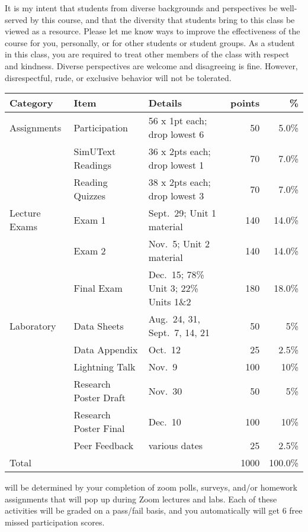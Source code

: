 \documentclass{tufte-handout}
\begin{document}
\begin{fullwidth}
 It is my intent that students from diverse backgrounds and perspectives be well-served by this course, and that the diversity that students bring to this class be viewed as a resource. Please let me know ways to improve the effectiveness of the course for you, personally, or for other students or student groups. As a student in this class, you are required to treat other members of the class with respect and kindness. Diverse perspectives are welcome and disagreeing is fine. However, disrespectful, rude, or exclusive behavior will not be tolerated.


\end{fullwidth}


\begin{fullwidth}



\begin{table}
\begin{tabular}{l l l r r}
Category & Item & Details & points & \% \\
\hline
Assignments & Participation & 56 x 1pt each; drop lowest 6 & 50 & 5.0\% \\
& SimUText Readings   & 36 x 2pts each; drop lowest 1 & 70 & 7.0\% \\
& Reading Quizzes  & 38 x 2pts each; drop lowest 3 & 70 & 7.0\% \\
\hline
Lecture Exams & Exam 1 & Sept.~29; Unit 1 material & 140 & 14.0\% \\
& Exam 2 & Nov.~5; Unit 2 material & 140 & 14.0\% \\
& Final Exam & Dec.~15; 78\% Unit 3; 22\% Units 1\&2 & 180 & 18.0\% \\ 		
\hline
Laboratory & Data Sheets & Aug.~24, 31, Sept.~7, 14, 21 & 50 & 5\% \\
& Data Appendix & Oct.~12 & 25 & 2.5\% \\
& Lightning Talk & Nov.~9 & 100 &  10\% \\
& Research Poster Draft & Nov.~30 & 50 & 5\% \\
& Research Poster Final & Dec.~10 & 100 & 10\% \\
& Peer Feedback & various dates & 25 & 2.5\% \\
\hline
Total & & & 1000 & 100.0\% 
\end{tabular}
\end{table}




\newpage

 will be determined by your completion of zoom polls, surveys, and/or homework assignments that will pop up during Zoom lectures and labs. Each of these activities will be graded on a pass/fail basis, and you automatically will get 6 free missed participation scores. 


\end{fullwidth}
\end{document}
